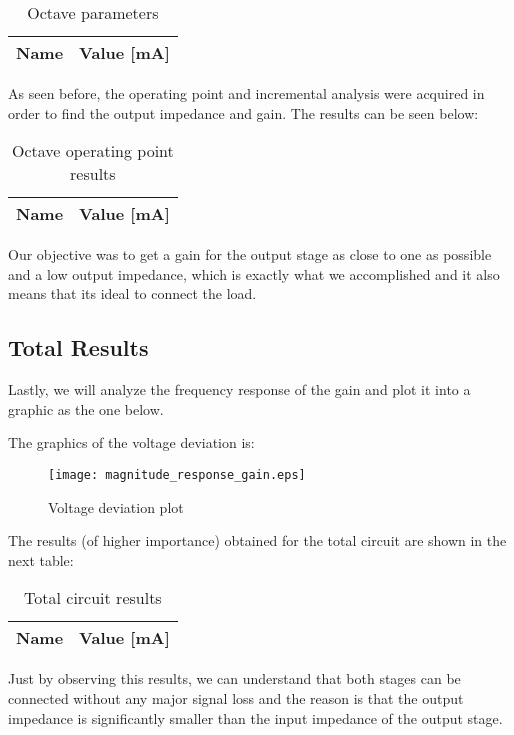 \begin{table}[H]
	\centering
	\begin{tabular}{|l|r|}
		\hline    
		{\bf Name} & {\bf Value [mA]} \\ \hline
		
	\end{tabular}
	\caption{Octave parameters}
	\label{tab:op}
\end{table}


As seen before, the operating point and incremental analysis were acquired in order to find the output impedance and gain.
The results can be seen below: 
\begin{table}[H]
	\centering
	\begin{tabular}{|l|r|}
		\hline    
		{\bf Name} & {\bf Value [mA]} \\ \hline
		
	\end{tabular}
	\caption{Octave operating point results}
	\label{tab:op}
\end{table}

Our objective was to get a gain for the output stage as close to one as possible and a low output impedance, which is exactly what we accomplished and it also means that its ideal to connect the load.

\subsection{Total Results}
Lastly, we will analyze the frequency response of the gain and plot it into a graphic as the one below. 

The graphics of the voltage deviation is:
\begin{figure}[H] \centering
\texttt{[image: magnitude\_response\_gain.eps]}
\caption{Voltage deviation plot}
\label{fig:rc4}
\end{figure}

The results (of higher importance) obtained for the total circuit are shown in the next table: 

\begin{table}[H]
	\centering
	\begin{tabular}{|l|r|}
		\hline    
		{\bf Name} & {\bf Value [mA]} \\ \hline
		
	\end{tabular}
	\caption{Total circuit results}
	\label{tab:op}
\end{table}

Just by observing this results, we can understand that both stages can be connected without any major signal loss and the reason is that the output impedance is significantly smaller than the input impedance of the output stage.